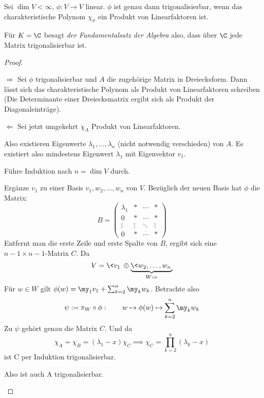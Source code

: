 \documentclass{mycourse}
\begin{document}
\begin{thm}
Sei $\dim V <\infty$, $\phi: V\to V$ linear.
$\phi$ ist genau dann trigonalisierbar, wenn das charakteristische Polynom $\chi_\phi$ ein Produkt von Linearfaktoren ist.
\begin{note}
Für $K=\C$ besagt \emph{der Fundamentalsatz der Algebra} also, dass über $\C$ jede Matrix trigonalisierbar ist.
\end{note}

\begin{proof}
	\begin{seg}{$\Longrightarrow$}
Sei $\phi$ trigonalisierbar und $A$ die zugehörige Matrix in Dreiecksform.
Dann lässt sich das charakteristische Polynom als Produkt von Linearfaktoren schreiben
(Die Determinante einer Dreiecksmatrix ergibt sich als Produkt der Diagonaleinträge).
\end{seg}
\begin{seg}{$\Longleftarrow$}
Sei jetzt umgekehrt $\chi_A$ Produkt von Linearfaktoren.

Also existieren Eigenwerte $\lambda_1, \dotsc, \lambda_n$ (nicht notwendig verschieden) von $A$.
Es existiert also mindestens Eigenwert $\lambda_1$ mit Eigenvektor $v_1$.

Führe Induktion nach $n=\dim V$ durch.

Ergänze $v_1$ zu einer Basis $v_1,w_2,\dotsc,w_n$ von $V$.
Bezüglich der neuen Basis hat $\phi$ die Matrix:
\[
B=\begin{pmatrix}\lambda_1 & * & \cdots & * \\
0 & * & \cdots & * \\
\vdots & \vdots & \ddots & \vdots \\
0 & * & \cdots & *
\end{pmatrix}
\]
Entfernt man die erste Zeile und erste Spalte von $B$, ergibt sich eine $n-1\times n-1$-Matrix $C$.
Da
\[
V=\<v_1\>\oplus \underbrace{\<w_2,\dotsc,w_n\>}_{W:=}
\]
Für $w\in W$ gilt $\phi(w)=\my_1v_1+\sum_{k=2}^n\my_kw_k$.
Betrachte also
\[
\psi := \pi_W \circ \phi:\qquad w\mapsto \phi(w)\mapsto \sum_{k=2}^n\my_kw_k
\]
Zu $\psi$ gehört genau die Matrix $C$.
Und da
\[
\chi_A= \chi_B = (\lambda_1-x)\chi_C \implies \chi_C = \prod_{k=2}^n(\lambda_k-x)
\]
ist C per Induktion trigonalisierbar.

Also ist auch A trigonalisierbar.
\end{seg}
\end{proof}
\end{thm}
\end{document}
